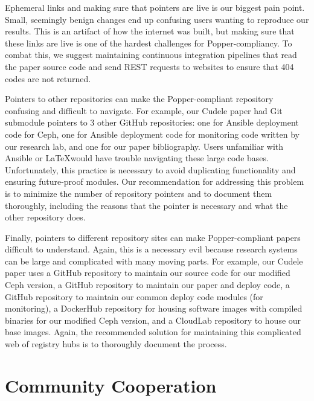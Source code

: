 Ephemeral links and making sure that pointers are live is our biggest pain
point. Small, seemingly benign changes end up confusing users wanting to
reproduce our results. This is an artifact of how the internet was built, but
making sure that these links are live is one of the hardest challenges for
Popper-compliancy. To combat this, we suggest maintaining continuous
integration pipelines that read the paper source code and send REST requests to
websites to ensure that 404 codes are not returned.

Pointers to other repositories can make the Popper-compliant repository
confusing and difficult to navigate. For example, our Cudele paper had Git
submodule pointers to 3 other GitHub repositories: one for Ansible deployment
code for Ceph, one for Ansible deployment code for monitoring code written by
our research lab, and one for our paper bibliography. Users unfamiliar with
Ansible or \LaTeX would have trouble navigating these large code bases.
Unfortunately, this practice is necessary to avoid duplicating functionality
and ensuring future-proof modules. Our recommendation for addressing this
problem is to minimize the number of repository pointers and to document them
thoroughly, including the reasons that the pointer is necessary and what the
other repository does.

Finally, pointers to different repository sites can make Popper-compliant
papers difficult to understand. Again, this is a necessary evil because
research systems can be large and complicated with many moving parts. For
example, our Cudele paper uses a GitHub repository to maintain our source code
for our modified Ceph version, a GitHub repository to maintain our paper and
deploy code, a GitHub repository to maintain our common deploy code modules
(for monitoring), a DockerHub repository for housing software images with
compiled binaries for our modified Ceph version, and a CloudLab repository to
house our base images. Again, the recommended solution for maintaining this
complicated web of registry hubs is to thoroughly document the process.


\section{Community Cooperation}
\label{sec:community-cooperation}

